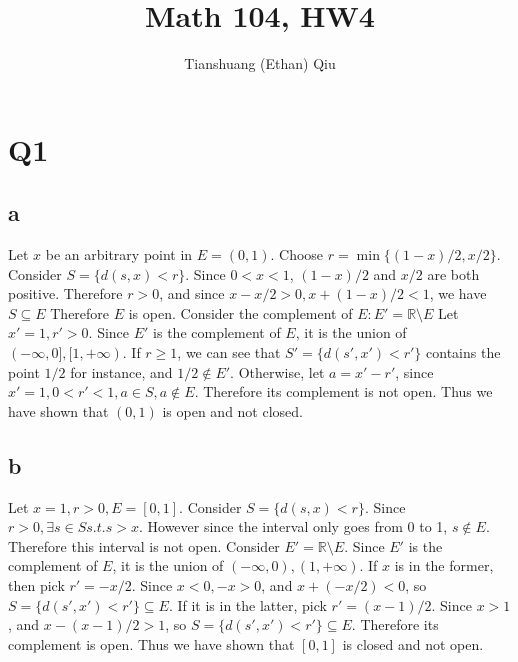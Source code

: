 \documentclass[12pt]{article}
\author{Tianshuang (Ethan) Qiu}
\newcommand{\R}{\mathbb{R}}
\begin{document}
\title{Math 104, HW4}
\maketitle
\newpage


\section{Q1}
\subsection{a}
Let $x$ be an arbitrary point in $E = (0,1)$. Choose $r = \min \{(1-x)/2, x/2\}$.
\newline
Consider $S = \{d(s,x)<r\}$. Since $0<x<1$, $(1-x)/2$ and $x/2$ are both positive. Therefore $r>0$, and since $x-x/2 > 0, x+(1-x)/2<1$, we have $S \subseteq E$
\newline
Therefore $E$ is open.
\newline
Consider the complement of $E: E' = \R \setminus E$
\newline
Let $x'=1, r'>0$. Since $E'$ is the complement of $E$, it is the union of $(-\infty, 0], [1, +\infty)$. If $r \geq 1$, we can see that $S' = \{d(s',x')<r'\}$ contains the point $1/2$ for instance, and $1/2 \notin E'$. Otherwise, let $a = x'-r'$, since $x'=1, 0<r'<1, a \in S, a \notin E$. Therefore its complement is not open.
\newline
Thus we have shown that $(0,1)$ is open and not closed.

\subsection{b}
Let $x=1, r>0, E=[0,1]$. Consider $S = \{d(s,x)<r\}$. Since $r>0, \exists s \in S s.t. s>x$. However since the interval only goes from 0 to 1, $s \notin E$. Therefore this interval is not open.
\newline
Consider $E' = \R \setminus E$.
\newline
Since $E'$ is the complement of $E$, it is the union of $(-\infty, 0), (1, +\infty)$. If $x$ is in the former, then pick $r' = -x/2$. Since $x<0, -x > 0$, and $x+(-x/2)<0$, so $S = \{d(s',x')<r'\} \subseteq E$.
\newline
If it is in the latter, pick $r' = (x-1)/2$. Since $x>1$, and $x-(x-1)/2>1$, so $S = \{d(s',x')<r'\} \subseteq E$. Therefore its complement is open.
\newline
Thus we have shown that $[0,1]$ is closed and not open.
\end{document}
